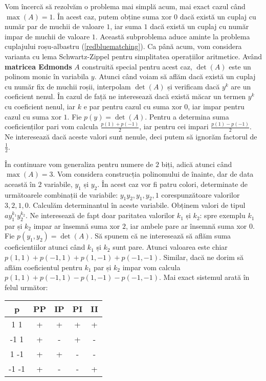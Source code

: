 Vom încercă să rezolvăm o problema mai simplă acum, mai exact cazul când $\max(A) = 1$. În acest caz, putem obține suma xor $0$ dacă există
un cuplaj cu număr par de muchii de valoare $1$, iar suma $1$ dacă există un cuplaj cu număr impar de muchii de valoare $1$. Această subproblema
aduce aminte la problema cuplajului roșu-albastru (\ref{redbluematching}). Ca până acum, vom considera varianta cu lema Schwartz-Zippel pentru
simplitatea operațiilor aritmetice. Având \textbf{matricea Edmonds} $A$ construită special pentru acest caz,
$\det(A)$ este un polinom monic în variabila $y$. Atunci când voiam să aflăm dacă există un cuplaj cu număr
fix de muchii roșii, interpolam $\det(A)$ și verificam dacă $y^{k}$ are un coeficient nenul. În cazul de față
ne interesează dacă există măcar un termen $y^{k}$ cu coeficient nenul, iar $k$ e par pentru cazul cu suma
xor $0$, iar impar pentru cazul cu suma xor $1$. Fie $p(y) = \det(A)$. Pentru a determina suma coeficienților
pari vom calcula $\frac{p(1) + p(-1)}{2}$, iar pentru cei impari $\frac{p(1) - p(-1)}{2}$. Ne interesează dacă
aceste valori sunt nenule, deci putem să ignorăm factorul de $\frac{1}{2}$.

În continuare vom generaliza pentru numere de $2$ biți, adică atunci când $\max(A) = 3$. Vom considera construcția polinomului de înainte,
dar de data această în $2$ variabile, $y_{1}$ și $y_{2}$. În acest caz vor fi patru colori, determinate de următoarele combinații de variabile:
$y_{1}y_{2}, y_{1}, y_{2}, 1$ corespunzătoare valorilor $3, 2, 1, 0$. Calculăm determinantul în aceste variabile. Obținem valori de tipul
$a y_{1}^{k_{1}}y_{2}^{k_{2}}$. Ne interesează de fapt doar paritatea valorilor $k_{1}$ și $k_{2}$: spre exemplu $k_{1}$ par și $k_{2}$ impar ar
însemnă suma xor $2$, iar ambele pare ar însemnă suma xor $0$. Fie $p(y_{1}, y_{2}) = \det(A)$. Să spunem că ne interesează să aflăm suma
coeficientiilor atunci când $k_{1}$ și $k_{2}$ sunt pare. Atunci valoarea este chiar $p(1, 1) + p(-1, 1) + p(1, -1) + p(-1, -1)$.
Similar, dacă ne dorim să aflăm coeficientul pentru $k_{1}$ par și $k_{2}$ impar vom calcula $p(1, 1) + p(-1, 1) - p(1, -1) - p(-1, -1)$.
Mai exact sistemul arată în felul următor:

\begin{center}
\begin{tabular}{ c| c | c | c | c |}
p & PP & IP & PI & II \\
\hline
1 1 & + & + & + & + \\
\hline
-1 1 & + & - & + & - \\
\hline
1 -1 & + & + & - & - \\
\hline
-1 -1 & + & - & - & + \\
\hline
\end{tabular}
\end{center}

